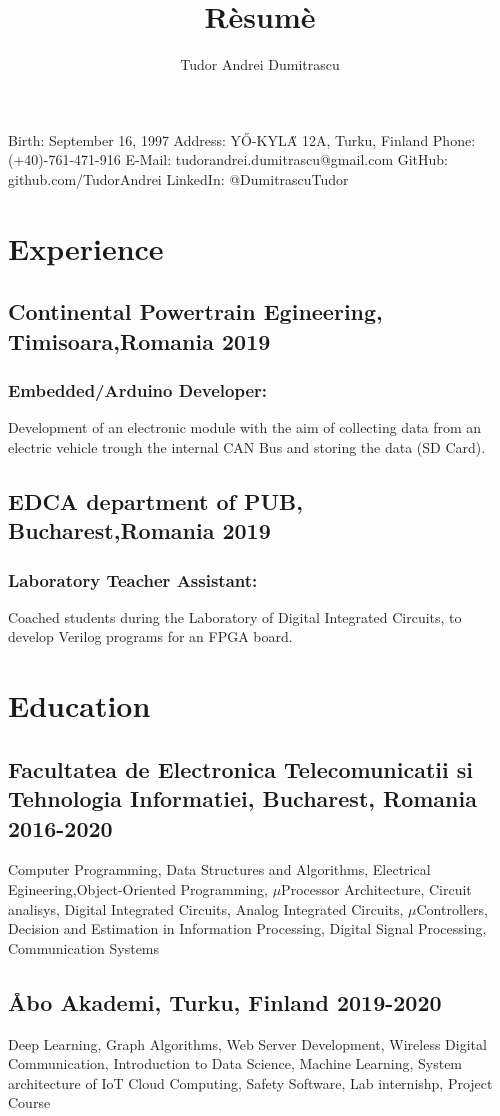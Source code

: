 \documentclass{article}
\makeatletter
\renewcommand{\maketitle}{
\begin{center}
{\huge\bfseries
\theauthor}

\end{center}
\vspace{.25em}
\begin{flushleft}{
Birth: September 16, 1997 \newline
Address: Y{\H O}-KYL{\H A} 12A, Turku, Finland \newline
Phone: (+40)-761-471-916 \newline
E-Mail: tudorandrei.dumitrascu@gmail.com \newline
GitHub: github.com/TudorAndrei \newline}
LinkedIn: @DumitrascuTudor \newline
\end{flushleft}
}
\makeatother
\begin{document}
\title{R\`esum\`e}
\author{Tudor Andrei Dumitrascu}

\maketitle


\section{Experience}
\subsection{Continental Powertrain Egineering, Timisoara,Romania 2019}
\subsubsection{Embedded/Arduino Developer:}
Development of an electronic module with the aim of collecting data from an electric vehicle trough the internal CAN Bus and storing the data (SD Card).
\subsection{EDCA department of PUB, Bucharest,Romania 2019}
\subsubsection{Laboratory Teacher Assistant:}
Coached students during the Laboratory of Digital Integrated Circuits, to develop Verilog programs for an FPGA board.

\section{Education}
\subsection{Facultatea de Electronica Telecomunicatii si Tehnologia Informatiei, Bucharest, Romania 2016-2020}
Computer Programming, Data Structures and Algorithms, Electrical Egineering,Object-Oriented Programming, $\mu$Processor Architecture, Circuit analisys, Digital Integrated Circuits, 
Analog Integrated Circuits, $\mu$Controllers, Decision and Estimation in Information Processing, Digital Signal Processing, Communication Systems

\subsection{{\AA}bo Akademi, Turku, Finland 2019-2020}
Deep Learning, Graph Algorithms, Web Server Development, Wireless Digital Communication, Introduction to Data Science, Machine Learning, System architecture of IoT Cloud Computing, Safety Software,
Lab internishp, Project Course
\end{document}
